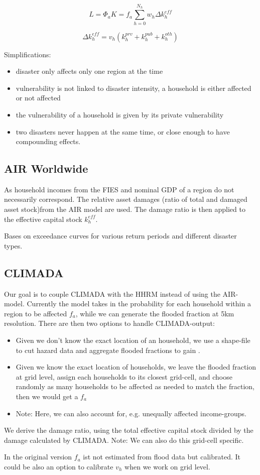 \documentclass{article}
\begin{document}
\begin{equation}
\label{eq:asset losses}
L = \Phi_{a}K = f_{a}\sum_{h=0}^{N_{h}}w_{h}\Delta k_{h}^{eff}
\end{equation}

\begin{equation}
\label{eq:direct loss of hh's capital stock}
\Delta k_{h}^{eff} = v_{h}(k_{h}^{prv}+k_{h}^{pub}+k_{h}^{oth})
\end{equation}

Simplifications: 
\begin{itemize}
	\item disaster only affects only one region at the time
	\item vulnerability is not linked to disaster intensity, a household is either affected or not affected
	\item the vulnerability of a household is given by its private vulnerability
	\item two disasters never happen at the same time, or close enough to have compounding effects.
	
\end{itemize}

\subsection{AIR Worldwide}

As household incomes from the FIES and nominal GDP of a region do not necessarily correspond. The relative asset damages (ratio of total and damaged asset stock)from the AIR model are used. The damage ratio is then applied to the effective capital stock $k_{h}^{eff}$.

Bases on exceedance curves for various return periods and different disaster types.

\subsection{CLIMADA}

Our goal is to couple CLIMADA with the HHRM instead of using the AIR-model. Currently the model takes in the probability for each household within a region to be affected $f_{a}$, while we can generate the flooded fraction at 5km resolution. There are then two options to handle CLIMADA-output:
\begin{itemize}
    \item Given we don't know the exact location of an household, we use a shape-file to cut hazard data and aggregate flooded fractions to gain .
    \item Given we know the exact location of households, we leave the flooded fraction at grid level, assign each households to its closest grid-cell, and choose randomly as many households to be affected as needed to match the fraction, then we would get a $f_{a}$
    \item Note: Here, we can also account for, e.g. unequally affected income-groups.
\end{itemize}
We derive the damage ratio, using the total effective capital stock divided by the damage calculated by CLIMADA. Note: We can also do this grid-cell specific.

In the original version $f_{a}$ ist not estimated from flood data but calibrated. It could be also an option to calibrate $v_{h}$ when we work on grid level.
\end{document}
